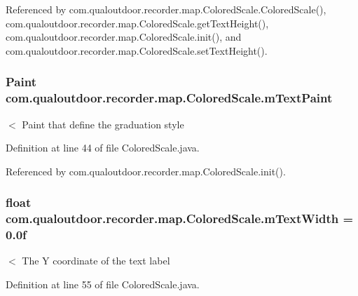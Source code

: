 Referenced by com.\-qualoutdoor.\-recorder.\-map.\-Colored\-Scale.\-Colored\-Scale(), com.\-qualoutdoor.\-recorder.\-map.\-Colored\-Scale.\-get\-Text\-Height(), com.\-qualoutdoor.\-recorder.\-map.\-Colored\-Scale.\-init(), and com.\-qualoutdoor.\-recorder.\-map.\-Colored\-Scale.\-set\-Text\-Height().

\hypertarget{classcom_1_1qualoutdoor_1_1recorder_1_1map_1_1ColoredScale_ace9a89e3cf770b47b0f474eca3c8b503}{
\subsubsection[{m\-Text\-Paint}]{\setlength{\rightskip}{0pt plus 5cm}Paint com.\-qualoutdoor.\-recorder.\-map.\-Colored\-Scale.\-m\-Text\-Paint\hspace{0.3cm}{\ttfamily [private]}}}\label{classcom_1_1qualoutdoor_1_1recorder_1_1map_1_1ColoredScale_ace9a89e3cf770b47b0f474eca3c8b503}
$<$ Paint that define the graduation style 

Definition at line 44 of file Colored\-Scale.\-java.



Referenced by com.\-qualoutdoor.\-recorder.\-map.\-Colored\-Scale.\-init().

\hypertarget{classcom_1_1qualoutdoor_1_1recorder_1_1map_1_1ColoredScale_a6b2b1664c8d9e81e37aea2a092938f90}{
\subsubsection[{m\-Text\-Width}]{\setlength{\rightskip}{0pt plus 5cm}float com.\-qualoutdoor.\-recorder.\-map.\-Colored\-Scale.\-m\-Text\-Width = 0.\-0f\hspace{0.3cm}{\ttfamily [private]}}}\label{classcom_1_1qualoutdoor_1_1recorder_1_1map_1_1ColoredScale_a6b2b1664c8d9e81e37aea2a092938f90}
$<$ The Y coordinate of the text label 

Definition at line 55 of file Colored\-Scale.\-java.



